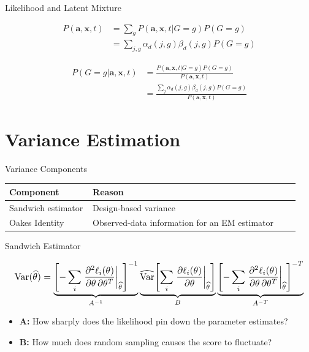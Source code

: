 \documentclass{beamer}
\begin{document}
\begin{frame}{Likelihood and Latent Mixture}

\[
\begin{aligned}
P(\mathbf{a,x},t) &= \sum_g P(\mathbf{a,x},t|G=g) P(G=g) \\
&= \sum_{j,g} \alpha_d(j,g)\beta_d(j,g)P(G=g)
\end{aligned}
\]

\bigskip
\bigskip

\[
\begin{aligned}
P(G=g|\mathbf{a,x},t)
&= \frac{P(\mathbf{a,x},t|G=g)P(G=g)}
        {P(\mathbf{a,x},t)} \\
&= \frac{\sum_j \alpha_d(j,g)\beta_d(j,g)P(G=g)}
        {P(\mathbf{a,x},t)}
\end{aligned}
\]

\bigskip
\bigskip

\end{frame}

\section[Variance]{Variance Estimation}

\begin{frame}{Variance Components}
\small
\renewcommand{\arraystretch}{1.35}
\begin{tabular}{@{}>{\raggedright\arraybackslash}p{0.27\linewidth}>{\raggedright\arraybackslash}p{0.67\linewidth}@{}}
\toprule
\textbf{Component} & \textbf{Reason} \\
\midrule
Sandwich estimator & Design-based variance \\
Oakes Identity & Observed-data information for an EM estimator \\
\bottomrule
\end{tabular}


\end{frame}

\begin{frame}{Sandwich Estimator}

\[
\resizebox{0.98\linewidth}{!}{$\displaystyle
\mathrm{Var}(\widehat\theta)
=
\underbrace{
\left[
-\sum_i
\left.\frac{\partial^2\ell_i(\theta)}{\partial\theta\,\partial\theta^T}
\right|_{\widehat\theta}
\right]^{-1}
}_{A^{-1}}
\underbrace{
\widehat{\mathrm{Var}}\!\left[
\sum_i
\left.\frac{\partial\ell_i(\theta)}{\partial\theta}
\right|_{\widehat\theta}
\right]
}_{B}
\underbrace{
\left[
-\sum_i
\left.\frac{\partial^2\ell_i(\theta)}{\partial\theta\,\partial\theta^T}
\right|_{\widehat\theta}
\right]^{-T}
}_{A^{-T}}
$}
\]

\begin{itemize}
    \item \textbf{A:} How sharply does the likelihood pin down the parameter estimates?
    \item \textbf{B:} How much does random sampling causes the score to fluctuate?
\end{itemize}

\end{frame}
\end{document}
